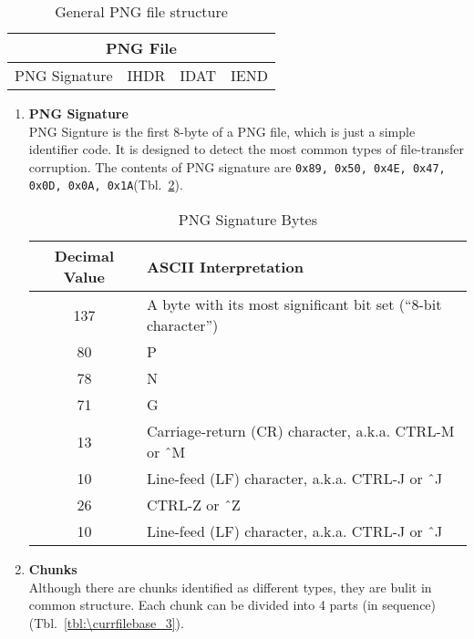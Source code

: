 \documentclass[catalog.tex]{subfiles}
\begin{document}
	\begin{table}[!htb]
		\caption{General PNG file structure}
		\label{tbl:\currfilebase_1}
		\centering
		\begin{tabular}{cccc}
			\toprule
			\multicolumn{4}{c}{PNG File} \\
			\midrule
			PNG Signature & IHDR & IDAT & IEND \\
			\bottomrule
		\end{tabular}
	\end{table}


	\begin{enumerate}
		\item {\bf PNG Signature}\\
		PNG Signture is the first 8-byte of a PNG file, which is just a simple identifier code. It is designed to detect the most common types of file-transfer corruption. The contents of PNG signature are {\tt 0x89, 0x50, 0x4E, 0x47, 0x0D, 0x0A, 0x1A}(Tbl.~\ref{tbl:\currfilebase_2}).


		\begin{table}[!htb]
			\caption{PNG Signature Bytes\cite{Ch.8}}
			\label{tbl:\currfilebase_2}
			\centering
			\begin{tabular}{cl}
				\toprule
				Decimal Value & ASCII Interpretation\\
				\midrule
				137 & A byte with its most significant bit set (``8-bit character'') \\
				\midrule
				80 & P \\
				\midrule
				78 & N \\
				\midrule
				71 & G \\
				\midrule
				13 & Carriage-return (CR) character, a.k.a. CTRL-M or \^\ M \\
				\midrule
				10 & Line-feed (LF) character, a.k.a. CTRL-J or \^\ J \\
				\midrule
				26 & CTRL-Z or \^\ Z \\
				\midrule
				10 & Line-feed (LF) character, a.k.a. CTRL-J or \^\ J \\
				\bottomrule
			\end{tabular}
		\end{table}


		\newpage
		\item {\bf Chunks}\\
		Although there are chunks identified as different types, they are bulit in common structure. Each chunk can be divided into 4 parts (in sequence) (Tbl.~\ref{tbl:\currfilebase_3}).



\end{enumerate}
\end{document}
